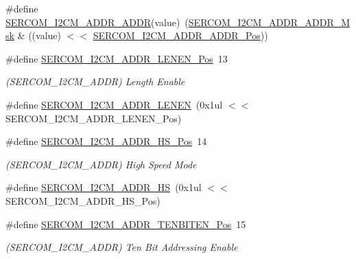 \begin{DoxyCompactItemize}
\#define \mbox{\hyperlink{group___s_a_m_d21___s_e_r_c_o_m_ga536c650ed878fb932e33d7d8c9c3775d}{S\+E\+R\+C\+O\+M\+\_\+\+I2\+C\+M\+\_\+\+A\+D\+D\+R\+\_\+\+A\+D\+DR}}(value)~(\mbox{\hyperlink{group___s_a_m_d21___s_e_r_c_o_m_ga2d6fa8e1a0522f1375e8964949d80636}{S\+E\+R\+C\+O\+M\+\_\+\+I2\+C\+M\+\_\+\+A\+D\+D\+R\+\_\+\+A\+D\+D\+R\+\_\+\+Msk}} \& ((value) $<$$<$ \mbox{\hyperlink{group___s_a_m_d21___s_e_r_c_o_m_ga80a69237a461051597db4746c45dd5a4}{S\+E\+R\+C\+O\+M\+\_\+\+I2\+C\+M\+\_\+\+A\+D\+D\+R\+\_\+\+A\+D\+D\+R\+\_\+\+Pos}}))
\item 
\#define \mbox{\hyperlink{group___s_a_m_d21___s_e_r_c_o_m_ga09b7c3b6a320a52bf17d8ad445924aac}{S\+E\+R\+C\+O\+M\+\_\+\+I2\+C\+M\+\_\+\+A\+D\+D\+R\+\_\+\+L\+E\+N\+E\+N\+\_\+\+Pos}}~13
\begin{DoxyCompactList}\small\item\em (S\+E\+R\+C\+O\+M\+\_\+\+I2\+C\+M\+\_\+\+A\+D\+DR) Length Enable \end{DoxyCompactList}\item 
\#define \mbox{\hyperlink{group___s_a_m_d21___s_e_r_c_o_m_ga3f2c60ee13d7755806c78ebc56118c2b}{S\+E\+R\+C\+O\+M\+\_\+\+I2\+C\+M\+\_\+\+A\+D\+D\+R\+\_\+\+L\+E\+N\+EN}}~(0x1ul $<$$<$ S\+E\+R\+C\+O\+M\+\_\+\+I2\+C\+M\+\_\+\+A\+D\+D\+R\+\_\+\+L\+E\+N\+E\+N\+\_\+\+Pos)
\item 
\#define \mbox{\hyperlink{group___s_a_m_d21___s_e_r_c_o_m_ga94cc6da2fa6b60bf69d815d70527240c}{S\+E\+R\+C\+O\+M\+\_\+\+I2\+C\+M\+\_\+\+A\+D\+D\+R\+\_\+\+H\+S\+\_\+\+Pos}}~14
\begin{DoxyCompactList}\small\item\em (S\+E\+R\+C\+O\+M\+\_\+\+I2\+C\+M\+\_\+\+A\+D\+DR) High Speed Mode \end{DoxyCompactList}\item 
\#define \mbox{\hyperlink{group___s_a_m_d21___s_e_r_c_o_m_ga6adcd1943d1670aa897cc9e0c75c6f5c}{S\+E\+R\+C\+O\+M\+\_\+\+I2\+C\+M\+\_\+\+A\+D\+D\+R\+\_\+\+HS}}~(0x1ul $<$$<$ S\+E\+R\+C\+O\+M\+\_\+\+I2\+C\+M\+\_\+\+A\+D\+D\+R\+\_\+\+H\+S\+\_\+\+Pos)
\item 
\#define \mbox{\hyperlink{group___s_a_m_d21___s_e_r_c_o_m_gaa75ef7da140f3f9cf0f9e7c36e5c948a}{S\+E\+R\+C\+O\+M\+\_\+\+I2\+C\+M\+\_\+\+A\+D\+D\+R\+\_\+\+T\+E\+N\+B\+I\+T\+E\+N\+\_\+\+Pos}}~15
\begin{DoxyCompactList}\small\item\em (S\+E\+R\+C\+O\+M\+\_\+\+I2\+C\+M\+\_\+\+A\+D\+DR) Ten Bit Addressing Enable \end{DoxyCompactList}\item 
$$
\end{DoxyCompactItemize}
